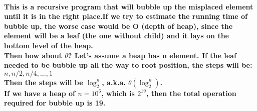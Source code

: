 \documentclass{article}
\begin{document}
\paragraph{This is a recursive program that will bubble up the misplaced element until it is in the right place.If we try to estimate the running time of bubble up, the worse case would be O (depth of heap), since the element will be a leaf (the one without child) and it lays on the bottom level of the heap.\\
Then how about $\theta$? Let's assume a heap has n element. If the leaf needed to be bubble up all the way to root position, the steps will be:\\
$n,n/2,n/4, \ldots ,1$\\
Then the steps will be $\log_2^n$, a.k.a. $\theta(\log_2^n)$.\\
If we have a heap of $n = 10^6$, which is $2^{19}$, then the total operation required for bubble up is 19.}
\end{document}
